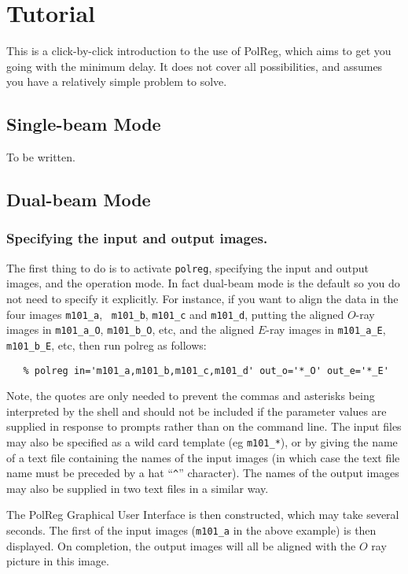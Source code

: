 \section {Tutorial}
This is a click-by-click introduction to the use of PolReg, which aims to
get you going with the minimum delay. It does not cover all possibilities,
and assumes you have a relatively simple problem to solve.

\subsection {Single-beam Mode}
To be written.

\subsection {Dual-beam Mode}

\subsubsection {Specifying the input and output images.}
The first thing to do is to activate {\tt polreg}, specifying the input and
output images, and the operation mode. In fact dual-beam mode is the
default so you do not need to specify it explicitly. For instance, if
you want to align the data in the four images {\tt m101\_a}, {\tt
m101\_b}, {\tt m101\_c} and {\tt m101\_d}, putting the aligned $O$-ray
images in {\tt m101\_a\_O}, {\tt m101\_b\_O}, etc, and the aligned
$E$-ray images in {\tt m101\_a\_E}, {\tt m101\_b\_E}, etc, then run
polreg as follows:

\begin{verbatim}
   % polreg in='m101_a,m101_b,m101_c,m101_d' out_o='*_O' out_e='*_E'
\end{verbatim}

Note, the quotes are only needed to prevent the commas and asterisks
being interpreted by the shell and should not be included if the
parameter values are supplied in response to prompts rather than on the
command line. The input files may also be specified as a wild card
template (eg {\verb+m101_*+}), or by giving the name of a text file
containing the names of the input images (in which case the text file
name must be preceded by a hat ``\verb+^+'' character). The names of the
output images may also be supplied in two text files in a similar way.

The PolReg Graphical User Interface is then constructed, which may take
several seconds. The first of the input images ({\tt m101\_a} in the
above example) is then displayed. On completion, the output images will all be
aligned with the $O$ ray picture in this image.

